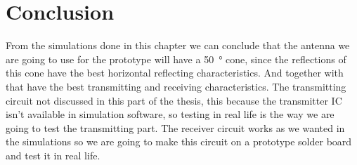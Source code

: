 \section{Conclusion}
From the simulations done in this chapter we can conclude that the antenna we are going to use for the prototype will have a \SI{50}{\degree} cone, since the reflections of this cone have the best horizontal reflecting characteristics. And together with that have the best transmitting and receiving characteristics.  The transmitting circuit not discussed in this part of the thesis, this because the transmitter IC \cite{MIC4428} isn't available in simulation software, so testing in real life is the way we are going to test the transmitting part. The receiver circuit works as we wanted in the simulations so we are going to make this circuit on a prototype solder board and test it in real life.
